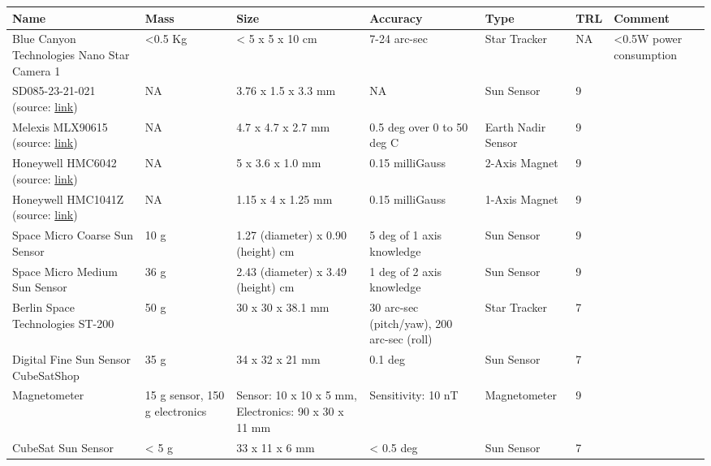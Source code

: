 \begin{center}
     \begin{tabular}{ | p{2.25cm} | p{1.25cm} | p{2cm} | p{4cm} | l | l | p{1.75cm} |}
     \hline

      {\bf Name} & {\bf Mass} & {\bf Size} & {\bf Accuracy} & {\bf Type} & {\bf TRL} & {\bf Comment}  \\ \hline

     Blue Canyon Technologies Nano Star Camera 1 \cite{BCT} & <0.5 Kg& < 5 x 5 x 10 cm & 7-24 arc-sec & Star Tracker & NA & <0.5W power consumption \\ \hline

     SD085-23-21-021 (source: \href{http://www.advancedphotonix.com/ap_products/pdfs/SD085-23-21-021.pdf}{link}) & NA & 3.76 x 1.5 x 3.3 mm & NA & Sun Sensor & 9 & \\ \hline

     Melexis MLX90615 (source: \href{http://goo.gl/7WGMAj}{link}) & NA & 4.7 x 4.7 x 2.7 mm & 0.5 deg over 0 to 50 deg C & Earth Nadir Sensor & 9 &  \\
     \hline

     Honeywell HMC6042 (source: \href{http://www.sssj.co.jp/products/magnetic/pdf/HMC6042.pdf}{link}) & NA & 5 x 3.6 x 1.0 mm & 0.15 milliGauss & 2-Axis Magnet & 9 &   \\ \hline

     Honeywell HMC1041Z (source: \href{http://www51.honeywell.com/aero/common/documents/myaerospacecatalog-documents/Missiles-Munitions/HMC1041Z.pdf}{link}) & NA &1.15 x 4 x 1.25 mm & 0.15 milliGauss & 1-Axis Magnet & 9 &   \\ \hline
     
     Space Micro Coarse Sun Sensor \cite{SMI} &  10 g & 1.27 (diameter) x 0.90 (height) cm & 5 deg of 1 axis knowledge & Sun Sensor & 9 & \\ \hline
     
     Space Micro Medium Sun Sensor \cite{SMI} & 36 g &	2.43 (diameter) x 3.49 (height) cm & 1 deg of 2 axis knowledge & Sun Sensor & 9 & \\ \hline
     
	Berlin Space Technologies ST-200 \cite{BST} & 50 g & 30 x 30 x 38.1 mm & 30 arc-sec (pitch/yaw), 200 arc-sec (roll) & Star Tracker & 7 & \\ \hline

	Digital Fine Sun Sensor CubeSatShop \cite{CubeShop} & 35 g & 34 x 32 x 21 mm & 0.1 deg & Sun Sensor & 7 & \\ \hline
	
	Magnetometer \cite{CubeShop} & 15 g sensor, 150 g electronics & Sensor: 10 x 10 x 5 mm, Electronics: 90 x 30 x 11 mm & Sensitivity: 10 nT & Magnetometer & 9 & \\ \hline
	
	CubeSat Sun Sensor \cite{CubeShop} & < 5 g & 33 x 11 x 6 mm & < 0.5 deg & Sun Sensor & 7 & \\ \hline

     \end{tabular}
\end{center}

